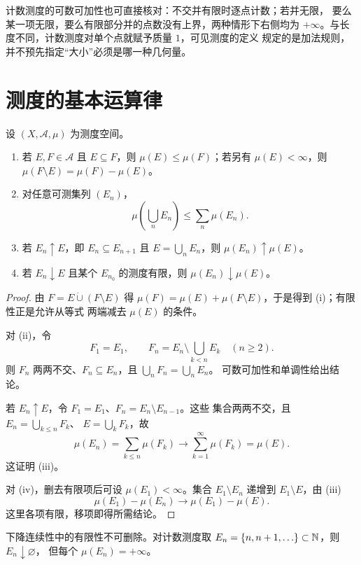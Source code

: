 计数测度的可数可加性也可直接核对：不交并有限时逐点计数；若并无限，
要么某一项无限，要么有限部分并的点数没有上界，两种情形下右侧均为
$+\infty$。与长度不同，计数测度对单个点就赋予质量 $1$，可见测度的定义
规定的是加法规则，并不预先指定“大小”必须是哪一种几何量。

\section{测度的基本运算律}

\begin{theorem}
\label{thm:measure-basic-continuity}
设 $(X,\mathcal A,\mu)$ 为测度空间。
\begin{enumerate}[label=\textup{(\roman*)}]
 \item 若 $E,F\in\mathcal A$ 且 $E\subseteq F$，则 $\mu(E)\le\mu(F)$；若另有
 $\mu(E)<\infty$，则 $\mu(F\setminus E)=\mu(F)-\mu(E)$。
 \item 对任意可测集列 $(E_n)$，
 \[
  \mu\!\left(\bigcup_nE_n\right)\le\sum_n\mu(E_n).
 \]
 \item 若 $E_n\uparrow E$，即 $E_n\subseteq E_{n+1}$ 且
 $E=\bigcup_nE_n$，则 $\mu(E_n)\uparrow\mu(E)$。
 \item 若 $E_n\downarrow E$ 且某个 $E_{n_0}$ 的测度有限，则
 $\mu(E_n)\downarrow\mu(E)$。
\end{enumerate}
\end{theorem}

\begin{proof}
由 $F=E\mathbin{\dot\cup}(F\setminus E)$ 得
$\mu(F)=\mu(E)+\mu(F\setminus E)$，于是得到 (i)；有限性正是允许从等式
两端减去 $\mu(E)$ 的条件。

对 (ii)，令
\[
 F_1=E_1,\qquad
 F_n=E_n\setminus\bigcup_{k<n}E_k\quad(n\ge2).
\]
则 $F_n$ 两两不交、$F_n\subseteq E_n$，且 $\bigcup_nF_n=\bigcup_nE_n$。
可数可加性和单调性给出结论。

若 $E_n\uparrow E$，令 $F_1=E_1$、$F_n=E_n\setminus E_{n-1}$。这些
集合两两不交，且 $E_n=\bigcup_{k\le n}F_k$、
$E=\bigcup_kF_k$，故
\[
 \mu(E_n)=\sum_{k\le n}\mu(F_k)
 \longrightarrow\sum_{k=1}^{\infty}\mu(F_k)=\mu(E).
\]
这证明 (iii)。

对 (iv)，删去有限项后可设 $\mu(E_1)<\infty$。集合
$E_1\setminus E_n$ 递增到 $E_1\setminus E$，由 (iii)
\[
 \mu(E_1)-\mu(E_n)
 \longrightarrow\mu(E_1)-\mu(E).
\]
这里各项有限，移项即得所需结论。
\end{proof}

下降连续性中的有限性不可删除。对计数测度取
$E_n=\{n,n+1,\ldots\}\subset\mathbb{N}$，则 $E_n\downarrow\varnothing$，
但每个 $\mu(E_n)=+\infty$。

